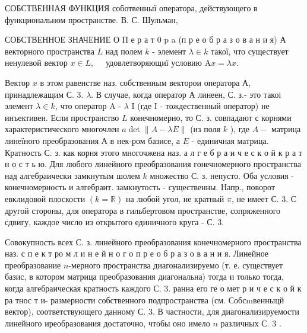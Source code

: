 \documentclass[10pt]{article}
\begin{document}
СОБСТВЕННАЯ ФУНКЦИЯ соботвенныї оператора, действующего в функциональном пространстве. В. С. Шульман,



СОБСТВЕННОЕ ЗНАЧЕНИЕ О П е р а т 0 p a (п р е о б р а з о в а н и я) А векторного пространства $L$ над полем $k$ - элемент $\lambda \in k$ такої, что существует ненулевой вектор $x \in L, \quad$ удовлетворяющиї условию $\mathrm{A} x=\lambda x$.



Вектор $x$ в этом равенстве наз. собственным векторои оператора А, принадлежащим С. 3. $\lambda$. В случае, когда оператор А линеен, С. з.- это такоі элемент $\lambda \in k$, что оператор A - $\lambda$ I (где I - тождественный оператор) не инъективен. Если пространство $L$ конечномерно, то С. з. совпадают с корнями характеристического многочлен $a \operatorname{det}\|A-\lambda E\|$ (из поля $k$ ), где $A-$ матрица линеїного преобразования А в нек-ром базисе, а $E$ - единичная матрица. Кратность С. з. как корня этого многочжена наз. а л г е б р а и ч е с к о й к р а т н о с т ь ю. Для любого линейного преобразования гонечномерного пространства над алгебраически замкнутым шолем $k$ множество С. з. непусто. Оба условия - конечномерность и алгебраит. замкнутость - существенны. Напр., поворот евклидовой плоскости $(k=\mathbb{R})$ на любой угол, не кратный $\pi$, не имеет С. 3. С другой стороны, для оператора в гильбертовом пространстве, сопряженного сдвигу, каждое число из открытого единичного круга - С. 3.



Совокупность всех С. з. линейного преобразования конечномерного пространства наз. с п е к т ро м л и н е й н о г о п р е о б р а з о в а н и я. Линейное преобразование $n$-мерного пространства диагонализируемо (т. е. существует базис, в котором матрица преобразования диагональна) тогда и только тогда, когда алгебраическая кратность каждого С. 3. ранна его ге о мет р и ч е с к о й к ра тнос т и- размерности собственного подпространства (см. Собсmвенныцй вектор), соответствующего данному С. 3. В частности, для диагонализируемости линейного иреобразования достаточно, чтобы оно имело $n$ различных С. 3 .
\end{document}
